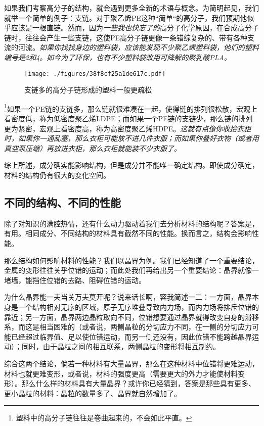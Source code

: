 如果我们考察高分子的结构，就会遇到更多全新的术语与概念。为简明起见，我们就举一个简单的例子：支链。对于聚乙烯PE这种“简单“的高分子，我们预期他似乎应该是一根直链。然而，因为\textsl{一些我也快忘了的}高分子化学原因，在合成高分子链时，往往会产生一些支链，这使PE高分子链更像一条错综复杂的、带有各种支流的河流。\textsl{如果你找找身边的塑料袋，应该能发现不少聚乙烯塑料袋，他们的塑料编号是2和4。如今为了环保，也有不少塑料袋改用可降解的聚乳酸PLA。}
\begin{figure}[ht]
\centering
\texttt{[image: ./figures/38f8cf25a1de617c.pdf]}
\caption{支链多的高分子链形成的塑料一般更疏松} \label{fig_MSEINT_4}
\end{figure}
\footnote{塑料中的高分子链往往是卷曲起来的，不会如此平直。}如果一个PE链的支链多，那么链就很难凑在一起，使得链的排列很松散，宏观上看密度低，称为低密度聚乙烯LDPE；而如果一个PE链的支链少，那么链的排列更为紧密，宏观上看密度高，称为高密度聚乙烯HDPE。\textsl{这就有点像你收拾衣柜时，如果你一通乱塞，那么衣柜可能放不进几件衣服；而如果你叠好衣物（或者用真空泵压缩）再放进衣柜，那么衣柜就能装不少衣服了。}

综上所述，成分确实能影响结构，但是成分并不能唯一确定结构。即使成分确定，材料的结构仍有很大的变化空间。
 
\subsection{不同的结构、不同的性能}

除了对知识的满腔热情，还有什么动力驱动着我们去分析材料的结构呢？答案是，有用。相同成分、不同结构的材料具有截然不同的性能。换而言之，结构会影响性能。

那么结构如何影响材料的性能？我们以晶界为例。我们已经知道了一个重要结论，金属的变形往往关乎位错的运动；而此处我们再给出另一个重要结论：晶界就像一堵墙，能挡住位错的去路、阻碍位错的运动。

为什么晶界能一夫当关万夫莫开呢？说来话长啊，容我简述一二：一方面，晶界本身是一个结构相对无序的区域，原子无序堆叠导致内力场，而内力场将排斥位错的靠近；另一方面，晶界两边晶粒取向不同，位错想要通过晶界就得改变自身的滑移系，而这是相当困难的（或者说，两侧晶粒的分切应力不同，在一侧的分切应力可能已经超过临界值、足以使位错运动，而另一侧还没有，因此位错不能跨越晶界运动）；同时，由于晶粒之间的相互联系，两侧晶粒的变形将相互制约。

综合这两个结论，倘若一种材料有大量晶界，那么在这种材料中位错将更难运动，材料也就更难变形，或者说，材料的强度更高（需要更大的外力才能使材料变形）。那么什么样的材料具有大量晶界？或许你已经猜到，答案是那些具有更多、更小晶粒的材料：晶粒的数量多了、晶界就自然增加了。

